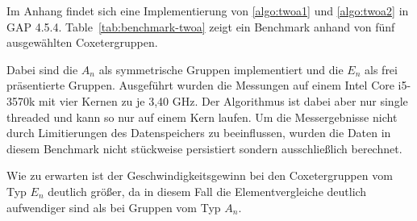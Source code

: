 Im Anhang findet sich eine Implementierung von \ref{algo:twoa1} und \ref{algo:twoa2}
in GAP 4.5.4. Table~\ref{tab:benchmark-twoa} zeigt ein Benchmark anhand von fünf
ausgewählten Coxetergruppen.

Dabei sind die $A_n$ als
symmetrische Gruppen implementiert und die $E_n$ als frei präsentierte Gruppen.
Ausgeführt wurden die Messungen auf einem Intel Core i5-3570k mit vier Kernen
zu je 3,40 GHz. Der Algorithmus ist dabei aber nur single threaded und kann so
nur auf einem Kern laufen. Um die Messergebnisse nicht durch Limitierungen des
Datenspeichers zu beeinflussen, wurden die Daten in diesem Benchmark nicht
stückweise persistiert sondern ausschließlich berechnet.

Wie zu erwarten ist der Geschwindigkeitsgewinn bei den Coxetergruppen vom Typ
$E_n$ deutlich größer, da in diesem Fall die Elementvergleiche deutlich
aufwendiger sind als bei Gruppen vom Typ $A_n$.